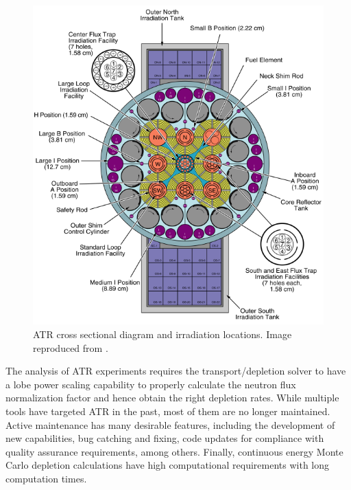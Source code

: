 \begin{figure}[htbp!]  %
  \begin{center}
    \includegraphics[scale=0.45]{figures/atr_view}
  \end{center}
  \caption{ATR cross sectional diagram and irradiation locations. Image reproduced from \cite{atr}.}
  \label{fig:atr-view}
\end{figure}

The analysis of ATR experiments requires the transport/depletion solver to have a lobe power scaling capability to properly calculate the neutron flux normalization factor and hence obtain the right depletion rates.
While multiple tools have targeted ATR in the past, most of them are no longer maintained.
Active maintenance has many desirable features, including the development of new capabilities, bug catching and fixing, code updates for compliance with quality assurance requirements, among others.
Finally, continuous energy Monte Carlo depletion calculations have high computational requirements with long computation times.

